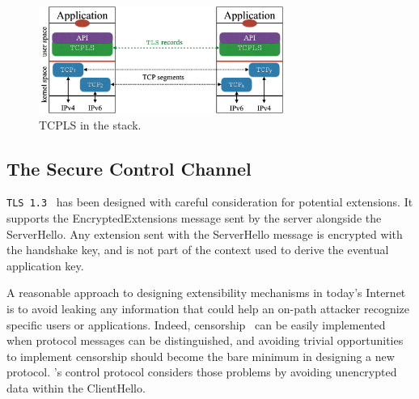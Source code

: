 
\begin{figure}[!t]
  \begin{center}
      \vspace{-1.5cm}
    \includegraphics[width=8cm]{figures/tcpls-fig2.pdf}
  \end{center}
  \vspace{-1.5cm}
  \caption{TCPLS in the stack.}
  \label{fig:arch}
    \vspace{-0.5cm}
\end{figure}



\subsection{The Secure Control Channel}\label{sec:extending}

\texttt{TLS 1.3}~\cite{rfc8446} has been designed with careful consideration for
potential extensions. It supports the EncryptedExtensions message sent by the
server alongside the ServerHello. Any extension sent with the ServerHello
message is
encrypted with the handshake key, and is not part of the context used
to derive the eventual application key.

A reasonable approach to designing extensibility mechanisms in today's
Internet is to avoid leaking any information that could help an
on-path attacker recognize specific users or applications.
Indeed, censorship~\cite{Morshed2017a, Gosain2017a,Chai2019a} can be easily implemented when protocol messages
can be distinguished, and avoiding trivial
opportunities to implement censorship should become the bare minimum in
designing a new protocol. \tcpls's control protocol considers those problems by
avoiding unencrypted data within the ClientHello.

